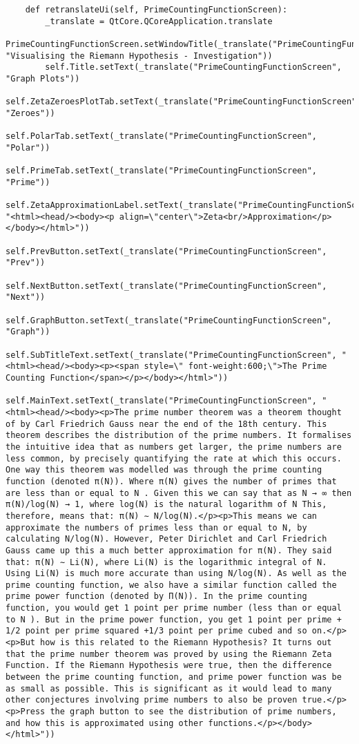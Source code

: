 \documentclass{article}
\begin{document}
\begin{lstlisting}
    def retranslateUi(self, PrimeCountingFunctionScreen):
        _translate = QtCore.QCoreApplication.translate
        PrimeCountingFunctionScreen.setWindowTitle(_translate("PrimeCountingFunctionScreen", "Visualising the Riemann Hypothesis - Investigation"))
        self.Title.setText(_translate("PrimeCountingFunctionScreen", "Graph Plots"))
        self.ZetaZeroesPlotTab.setText(_translate("PrimeCountingFunctionScreen", "Zeroes"))
        self.PolarTab.setText(_translate("PrimeCountingFunctionScreen", "Polar"))
        self.PrimeTab.setText(_translate("PrimeCountingFunctionScreen", "Prime"))
        self.ZetaApproximationLabel.setText(_translate("PrimeCountingFunctionScreen", "<html><head/><body><p align=\"center\">Zeta<br/>Approximation</p></body></html>"))
        self.PrevButton.setText(_translate("PrimeCountingFunctionScreen", "Prev"))
        self.NextButton.setText(_translate("PrimeCountingFunctionScreen", "Next"))
        self.GraphButton.setText(_translate("PrimeCountingFunctionScreen", "Graph"))
        self.SubTitleText.setText(_translate("PrimeCountingFunctionScreen", "<html><head/><body><p><span style=\" font-weight:600;\">The Prime Counting Function</span></p></body></html>"))
        self.MainText.setText(_translate("PrimeCountingFunctionScreen", "<html><head/><body><p>The prime number theorem was a theorem thought of by Carl Friedrich Gauss near the end of the 18th century. This theorem describes the distribution of the prime numbers. It formalises the intuitive idea that as numbers get larger, the prime numbers are less common, by precisely quantifying the rate at which this occurs. One way this theorem was modelled was through the prime counting function (denoted π(N)). Where π(N) gives the number of primes that are less than or equal to N . Given this we can say that as N → ∞ then π(N)/log(N) → 1, where log(N) is the natural logarithm of N This, therefore, means that: π(N) ∼ N/log(N).</p><p>This means we can approximate the numbers of primes less than or equal to N, by calculating N/log(N). However, Peter Dirichlet and Carl Friedrich Gauss came up this a much better approximation for π(N). They said that: π(N) ∼ Li(N), where Li(N) is the logarithmic integral of N. Using Li(N) is much more accurate than using N/log(N). As well as the prime counting function, we also have a similar function called the prime power function (denoted by Π(N)). In the prime counting function, you would get 1 point per prime number (less than or equal to N ). But in the prime power function, you get 1 point per prime + 1/2 point per prime squared +1/3 point per prime cubed and so on.</p><p>But how is this related to the Riemann Hypothesis? It turns out that the prime number theorem was proved by using the Riemann Zeta Function. If the Riemann Hypothesis were true, then the difference between the prime counting function, and prime power function was be as small as possible. This is significant as it would lead to many other conjectures involving prime numbers to also be proven true.</p><p>Press the graph button to see the distribution of prime numbers, and how this is approximated using other functions.</p></body></html>"))
\end{lstlisting}
\end{document}
